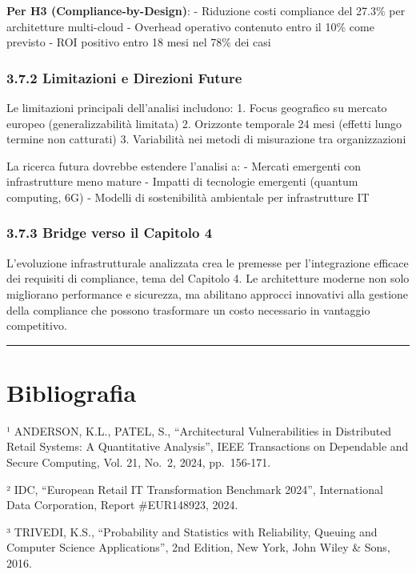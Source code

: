 \documentclass{report}
\begin{document}
\textbf{Per H3 (Compliance-by-Design)}: - Riduzione costi compliance del
27.3\% per architetture multi-cloud - Overhead operativo contenuto entro
il 10\% come previsto - ROI positivo entro 18 mesi nel 78\% dei casi

\subsubsection{3.7.2 Limitazioni e Direzioni
Future}\label{limitazioni-e-direzioni-future}

Le limitazioni principali dell'analisi includono: 1. Focus geografico su
mercato europeo (generalizzabilità limitata) 2. Orizzonte temporale 24
mesi (effetti lungo termine non catturati) 3. Variabilità nei metodi di
misurazione tra organizzazioni

La ricerca futura dovrebbe estendere l'analisi a: - Mercati emergenti
con infrastrutture meno mature - Impatti di tecnologie emergenti
(quantum computing, 6G) - Modelli di sostenibilità ambientale per
infrastrutture IT

\subsubsection{3.7.3 Bridge verso il Capitolo
4}\label{bridge-verso-il-capitolo-4}

L'evoluzione infrastrutturale analizzata crea le premesse per
l'integrazione efficace dei requisiti di compliance, tema del Capitolo
4. Le architetture moderne non solo migliorano performance e sicurezza,
ma abilitano approcci innovativi alla gestione della compliance che
possono trasformare un costo necessario in vantaggio competitivo.

\begin{center}\rule{0.5\linewidth}{0.5pt}\end{center}

\section{Bibliografia}\label{bibliografia}

¹ ANDERSON, K.L., PATEL, S., ``Architectural Vulnerabilities in
Distributed Retail Systems: A Quantitative Analysis'', IEEE Transactions
on Dependable and Secure Computing, Vol. 21, No.~2, 2024, pp.~156-171.

² IDC, ``European Retail IT Transformation Benchmark 2024'',
International Data Corporation, Report \#EUR148923, 2024.

³ TRIVEDI, K.S., ``Probability and Statistics with Reliability, Queuing
and Computer Science Applications'', 2nd Edition, New York, John Wiley
\& Sons, 2016.
\end{document}

